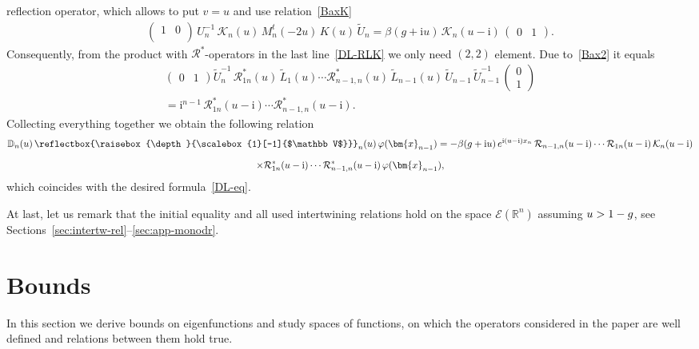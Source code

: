 \documentclass[11pt]{article}
\numberwithin{equation}{section}
\theoremstyle{plain}
\theoremstyle{definition}
\newcommand{\bbLambda}{\reflectbox{\raisebox{\depth}{\scalebox{1}[-1]{$\mathbb V$}}}}
\newcommand{\D}{\mathbb{D}}
\newcommand{\LLambda}{\bbLambda}
\let\Im\relax
\DeclareMathOperator{\Im}{Im}
\renewcommand{\phi}{\varphi}
\renewcommand{\imath}{\mathrm{i}}
\begin{document}
reflection operator, which allows to put $v=u$ and use relation~\eqref{BaxK}
\begin{align}
\begin{pmatrix}
1 & 0 \\
	\end{pmatrix}\,
U^{-1}_n\,\mathcal{K}_n(u) \, M^t_n(-2u) \, K(u) \,\widetilde{U}_n = \beta (g + \imath u) \, \mathcal{K}_n(u-\imath) \, 
\begin{pmatrix}
	0 & 1
\end{pmatrix}.
\end{align}
Consequently, from the product with $\mathcal{R}^*$-operators in the last line~\eqref{DL-RLK} we only need $(2,2)$ element. Due to~\eqref{Bax2} it equals
\begin{multline}
\begin{pmatrix}
	0 & 1
\end{pmatrix}
\widetilde{U}^{-1}_n \,\mathcal{R}^*_{1n}(u) \, 
\widetilde{L}_1(u)  \cdots \mathcal{R}^*_{n-1, n}(u) \, 
\widetilde{L}_{n-1}(u) \, \widetilde{U}_{n-1} \,\widetilde{U}^{-1}_{n-1}\,
\begin{pmatrix}
	0 \\
	1
\end{pmatrix} \\[6pt]  
= \imath^{n-1}\,\mathcal{R}^*_{1 n}(u-\imath)\cdots\mathcal{R}^*_{n-1, n}(u-\imath).
\end{multline}
Collecting everything together we obtain the following relation 
\begin{multline}
\D_n(u)\,\LLambda_n(u) \, \phi(\bm{x}_{n-1})
= - \beta (g + \imath u) \, e^{\imath (u - \imath) x_n}\, \mathcal{R}_{n-1, n}(u-\imath)
\cdots \mathcal{R}_{1 n}(u-\imath)\,
\mathcal{K}_n(u - \imath)  \\[6pt]
\times \mathcal{R}^*_{1 n}(u-\imath)\cdots\mathcal{R}^*_{n-1, n}(u-\imath)\,
\phi(\bm{x}_{n-1}) ,
\end{multline}
which coincides with the desired formula~\eqref{DL-eq}. 

At last, let us remark that the initial equality and all used intertwining relations hold on the space $\mathcal{E}(\mathbb{R}^n)$ assuming $\Im u > 1 - g$, see Sections~\ref{sec:intertw-rel}--\ref{sec:app-monodr}.

\section{Bounds} \label{sec:bounds}

In this section we derive bounds on eigenfunctions and study spaces of functions, on which the operators considered in the paper are well defined and relations between them hold true.
\end{document}
